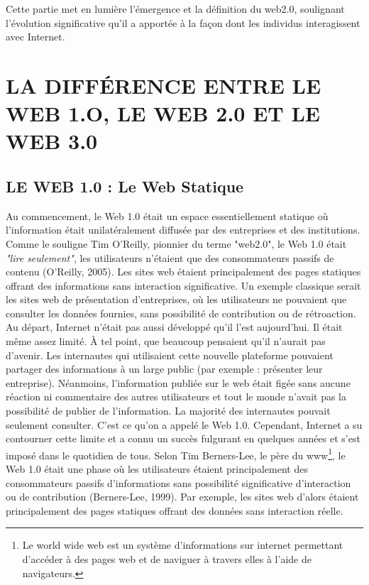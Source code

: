 \documentclass[12pt,a4paper]{article} %
\begin{document}
	Cette partie met en lumière l'émergence et la définition du web2.0, soulignant l'évolution significative qu'il a apportée à la façon dont les individus interagissent avec Internet.
	
	
	\section{\textbf{LA DIFFÉRENCE ENTRE LE WEB 1.O, LE WEB 2.0 ET LE WEB 3.0}}
	\subsection{\textbf{LE WEB 1.0 : Le Web Statique}}
	Au commencement, le Web 1.0 était un espace essentiellement statique où l'information était unilatéralement diffusée par des entreprises et des institutions. Comme le souligne Tim O’Reilly, pionnier du terme "web2.0", le Web 1.0 était \textit{"lire seulement"}, les utilisateurs n'étaient que des consommateurs passifs de contenu (O’Reilly, 2005).  
	Les sites web étaient principalement des pages statiques offrant des informations sans interaction significative. Un exemple classique serait les sites web de présentation d'entreprises, où les utilisateurs ne pouvaient que consulter les données fournies, sans possibilité de contribution ou de rétroaction. Au départ, Internet n’était pas aussi développé qu’il l’est aujourd’hui. Il était même assez limité. À tel point, que beaucoup pensaient qu’il n’aurait pas d’avenir. Les internautes qui utilisaient cette nouvelle plateforme pouvaient partager des informations à un large public (par exemple : présenter leur entreprise). Néanmoins, l’information publiée sur le web était figée sans aucune réaction ni commentaire des autres utilisateurs et tout le monde n’avait pas la possibilité de publier de l’information. La majorité des internautes pouvait seulement consulter. C’est ce qu’on a appelé le Web 1.0. Cependant, Internet a su contourner cette limite et a connu un succès fulgurant en quelques années et s’est imposé dans le quotidien de tous.
	Selon Tim Berners-Lee, le père du www\footnote[2]{Le world wide web est un système d'informations sur internet permettant d'accéder à des pages web et de naviguer à travers elles à l'aide de navigateurs.}, le Web 1.0 était une phase où les utilisateurs étaient principalement des consommateurs passifs d'informations sans possibilité significative d'interaction ou de contribution (Berners-Lee, 1999). Par exemple, les sites web d'alors étaient principalement des pages statiques offrant des données sans interaction réelle.
\end{document}
